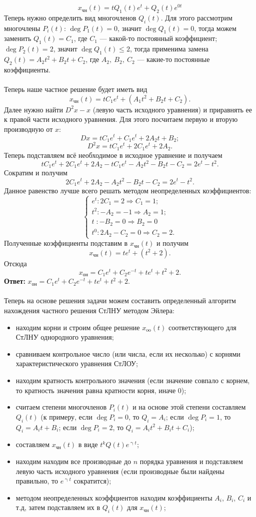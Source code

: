 \documentclass[a4paper, 12pt]{article}
\begin{document}
	$$x_\text{чн}(t) = tQ_1(t)e^{t} + Q_2(t)e^{0t}$$
	Теперь нужно определить вид многочленов $Q_i(t)$. Для этого рассмотрим многочлены $P_i(t)$: $\deg P_1(t) = 0$, значит $\deg Q_1(t) = 0$, тогда можем заменить $Q_1(t) = C_1$, где $C_1$ --- какой-то постоянный коэффициент; $\deg P_2(t) = 2$, значит $\deg Q_1(t) \leqslant 2$, тогда применима замена $Q_2(t) = A_2t^2 + B_2t + C_2$, где $A_2,\ B_2,\ C_2$ --- какие-то постоянные коэффициенты.\\\\
	Теперь наше частное решение будет иметь вид $$x_\text{чн}(t) = tC_1e^t + (A_1t^2 + B_2t + C_2).$$
	Далее нужно найти $D^2x - x$ (левую часть исходного уравнения) и приравнять ее к правой части исходного уравнения. Для этого посчитаем первую и вторую производную от $x$:
	$$Dx = tC_1e^t + C_1e^t + 2A_2t + B_2;$$
	$$D^2x = tC_1e^t + 2C_1e^t + 2A_2.$$
	Теперь подставляем всё необходимое в исходное уравнение и получаем $$tC_1e^t + 2C_1e^t + 2A_2 - tC_1e^t - A_2t^2 - B_2t - C_2  = 2e^t - t^2.$$
	Сократим и получим
	$$2C_1e^t + 2A_2 - A_2t^2 - B_2t - C_2  = 2e^t - t^2.$$
	Данное равенство лучше всего решать методом неопределенных коэффициентов: $$\begin{cases}
		e^t : 2C_1 = 2 \Rightarrow C_1 = 1;\\
		t^2 : -A_2 = -1 \Rightarrow A_2 = 1;\\
		t\; : -B_2 = 0 \Rightarrow B_2 = 0\\
		t^0 : 2A_2 - C_2 = 0 \Rightarrow C_2 = 2.
	\end{cases}$$
	Полученные коэффициенты подставим в $x_\text{чн}(t)$ и получим $$x_\text{чн}(t) = te^t + (t^2 + 2).$$
	Отсюда $$x_\text{он} = C_1e^t + C_2e^{-t} + te^t + t^2 + 2.$$
	\textbf{Ответ:} $x_\text{он} = C_1e^t + C_2e^{-t} + te^t + t^2 + 2.$\\\\
	Теперь на основе решения задачи можем составить определенный алгоритм нахождения частного решения СтЛНУ методом Эйлера:\begin{itemize}
		\item находим корни и строим общее решение $x_\text{oo}(t)$ соответствующего для СтЛНУ однородного уравнения;
		\item сравниваем контрольное число (или числа, если их несколько) с корнями характеристического уравнения СтЛОУ;
		\item находим кратность контрольного значения (если значение совпало с корнем, то кратность значения равна кратности корня, иначе 0);
		\item считаем степени многочленов $P_i(t)$ и на основе этой степени составляем $Q_i(t)$ (к примеру, если $\deg P_i = 0$, то $Q_i = A_i$; если $\deg P_i = 1$, то $Q_i = A_it + B_i$; если $\deg P_i = 2$, то $Q_i = A_it^2 + B_it + C_i$);
		\item составляем $x_\text{чн}(t)$ в виде $t^kQ(t)e^{\upgamma t}$;
		\item находим находим все производные до $n$ порядка уравнения и подставляем левую часть исходного уравнения (если производные были найдены правильно, то $e^{\upgamma t}$ сократится);
		\item методом неопределенных коэффциентов находим коэффициенты $A_i$, $B_i$, $C_i$ и т.д, затем подставляем их в $Q_i(t)$ для $x_\text{чн}(t)$;
	\end{itemize}
\end{document}
